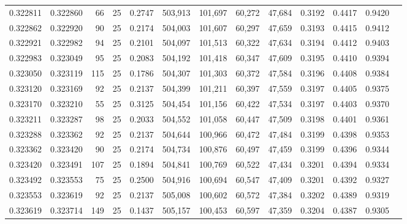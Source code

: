 \begin{tabular}{rrrrrrrrrrrrr}
0.322811 & 0.322860 &    66 &  25 &                                     0.2747 & 503,913 & 101,697 &  60,272 &  47,684 & 0.3192 & 0.4417 & 0.9420 \\
0.322862 & 0.322920 &    90 &  25 &                                     0.2174 & 504,003 & 101,607 &  60,297 &  47,659 & 0.3193 & 0.4415 & 0.9412 \\
0.322921 & 0.322982 &    94 &  25 &                                     0.2101 & 504,097 & 101,513 &  60,322 &  47,634 & 0.3194 & 0.4412 & 0.9403 \\
0.322983 & 0.323049 &    95 &  25 &                                     0.2083 & 504,192 & 101,418 &  60,347 &  47,609 & 0.3195 & 0.4410 & 0.9394 \\
0.323050 & 0.323119 &   115 &  25 &                                     0.1786 & 504,307 & 101,303 &  60,372 &  47,584 & 0.3196 & 0.4408 & 0.9384 \\
0.323120 & 0.323169 &    92 &  25 &                                     0.2137 & 504,399 & 101,211 &  60,397 &  47,559 & 0.3197 & 0.4405 & 0.9375 \\
0.323170 & 0.323210 &    55 &  25 &                                     0.3125 & 504,454 & 101,156 &  60,422 &  47,534 & 0.3197 & 0.4403 & 0.9370 \\
0.323211 & 0.323287 &    98 &  25 &                                     0.2033 & 504,552 & 101,058 &  60,447 &  47,509 & 0.3198 & 0.4401 & 0.9361 \\
0.323288 & 0.323362 &    92 &  25 &                                     0.2137 & 504,644 & 100,966 &  60,472 &  47,484 & 0.3199 & 0.4398 & 0.9353 \\
0.323362 & 0.323420 &    90 &  25 &                                     0.2174 & 504,734 & 100,876 &  60,497 &  47,459 & 0.3199 & 0.4396 & 0.9344 \\
0.323420 & 0.323491 &   107 &  25 &                                     0.1894 & 504,841 & 100,769 &  60,522 &  47,434 & 0.3201 & 0.4394 & 0.9334 \\
0.323492 & 0.323553 &    75 &  25 &                                     0.2500 & 504,916 & 100,694 &  60,547 &  47,409 & 0.3201 & 0.4392 & 0.9327 \\
0.323553 & 0.323619 &    92 &  25 &                                     0.2137 & 505,008 & 100,602 &  60,572 &  47,384 & 0.3202 & 0.4389 & 0.9319 \\
0.323619 & 0.323714 &   149 &  25 &                                     0.1437 & 505,157 & 100,453 &  60,597 &  47,359 & 0.3204 & 0.4387 & 0.9305 \\

\end{tabular}
